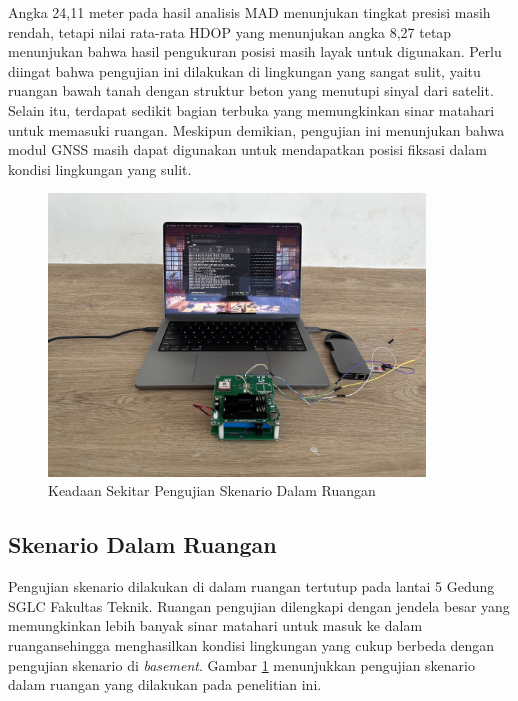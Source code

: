 Angka 24,11 meter pada hasil analisis MAD menunjukan tingkat presisi masih rendah, tetapi nilai rata-rata HDOP yang menunjukan angka 8,27 tetap menunjukan bahwa hasil pengukuran posisi masih layak untuk digunakan. Perlu diingat bahwa pengujian ini dilakukan di lingkungan yang sangat sulit, yaitu ruangan bawah tanah dengan struktur beton yang menutupi sinyal dari satelit. Selain itu, terdapat sedikit bagian terbuka yang memungkinkan sinar matahari untuk memasuki ruangan. Meskipun demikian, pengujian ini menunjukan bahwa modul GNSS masih dapat digunakan untuk mendapatkan posisi fiksasi dalam kondisi lingkungan yang sulit.

\begin{figure}[H]
	\centering
	\includegraphics[width=10cm]{contents/chapter-4/2-skenario-indoor/keadaan.jpg}
	\caption{Keadaan Sekitar Pengujian Skenario Dalam Ruangan}
	\label{Fig: indoor-keadaan}
\end{figure}

\subsection{Skenario Dalam Ruangan}
Pengujian skenario dilakukan di dalam ruangan tertutup pada lantai 5 Gedung SGLC Fakultas Teknik. Ruangan pengujian dilengkapi dengan jendela besar yang memungkinkan lebih banyak sinar matahari untuk masuk ke dalam ruangansehingga menghasilkan kondisi lingkungan yang cukup berbeda dengan pengujian skenario di \textit{basement}. Gambar \ref{Fig: indoor-keadaan} menunjukkan pengujian skenario dalam ruangan yang dilakukan pada penelitian ini.

